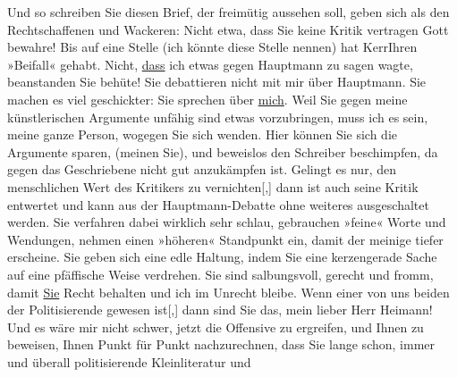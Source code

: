 \begin{ledgroupsized}[t]{13cm}
           Und so schreiben Sie diesen Brief, der freimütig aussehen soll, geben sich als den
               Rechtschaffenen und Wackeren: Nicht etwa, dass Sie keine Kritik vertragen {\dotstwo} Gott bewahre! Bis auf eine Stelle (ich könnte diese
               Stelle nennen) hat 
               KerrIhren »Beifall« gehabt. Nicht,
                  \uline{dass} ich etwas gegen Hauptmann zu sagen wagte, beanstanden Sie {\dotstwo} behüte! Sie debattieren nicht mit mir über Hauptmann. Sie machen es viel geschickter: Sie
               sprechen über \uline{mich}. Weil Sie gegen meine
               künstlerischen Argumente unfähig sind etwas vorzubringen, muss ich es sein, meine
               ganze Person, wogegen Sie sich wenden. Hier können Sie sich die Argumente sparen,
               (meinen Sie), und beweislos den Schreiber beschimpfen, da gegen das Geschriebene
               nicht gut anzukämpfen ist. Gelingt es nur, den menschlichen Wert des Kritikers zu
                  vernichten{[},{]} dann ist auch seine Kritik entwertet und kann aus der Hauptmann-Debatte ohne weiteres ausgeschaltet
               werden.\pend
           \pstart
           Sie verfahren dabei wirklich sehr schlau, gebrauchen »feine« Worte und Wendungen,
               nehmen einen »höheren« Standpunkt ein, damit der meinige tiefer erscheine. Sie geben
               sich eine edle Haltung, indem Sie eine kerzengerade Sache auf eine pfäffische Weise
               verdrehen. Sie sind salbungsvoll, gerecht und fromm, damit \uline{Sie} Recht behalten und ich im Unrecht bleibe.\pend
           \pstart
           Wenn einer von uns beiden der Politisierende gewesen ist{[},{]} dann
               sind Sie das, mein lieber Herr Heimann! Und es
               wäre mir nicht schwer, jetzt die Offensive zu ergreifen, und Ihnen zu beweisen, Ihnen
               Punkt für Punkt nachzurechnen, dass Sie lange schon, immer und überall politisierende Kleinliteratur und

\end{ledgroupsized}
